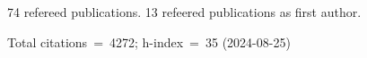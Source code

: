 74 refereed publications. 13 refeered publications as first author.

Total citations~=~4272; h-index~=~35 (2024-08-25)